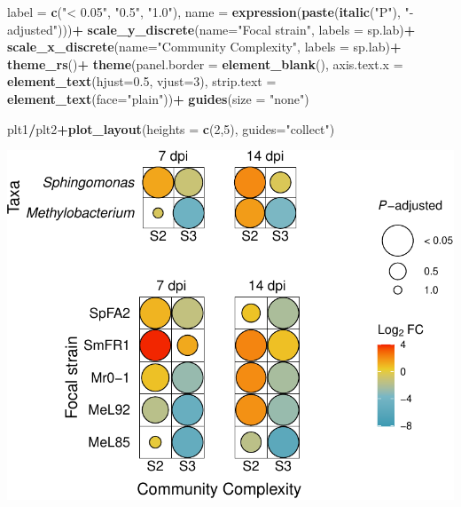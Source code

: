 \documentclass[
]{article}
\newenvironment{Shaded}{\begin{snugshade}}{\end{snugshade}}
\newcommand{\AttributeTok}[1]{\textcolor[rgb]{0.13,0.29,0.53}{#1}}
\newcommand{\DecValTok}[1]{\textcolor[rgb]{0.00,0.00,0.81}{#1}}
\newcommand{\FloatTok}[1]{\textcolor[rgb]{0.00,0.00,0.81}{#1}}
\newcommand{\FunctionTok}[1]{\textcolor[rgb]{0.13,0.29,0.53}{\textbf{#1}}}
\newcommand{\NormalTok}[1]{#1}
\newcommand{\SpecialCharTok}[1]{\textcolor[rgb]{0.81,0.36,0.00}{\textbf{#1}}}
\newcommand{\StringTok}[1]{\textcolor[rgb]{0.31,0.60,0.02}{#1}}
\begin{document}
\begin{Shaded}
\begin{Highlighting}[]
                          \AttributeTok{label =} \FunctionTok{c}\NormalTok{(}\StringTok{"\textless{} 0.05"}\NormalTok{, }\StringTok{"0.5"}\NormalTok{, }\StringTok{"1.0"}\NormalTok{), }\AttributeTok{name =} \FunctionTok{expression}\NormalTok{(}\FunctionTok{paste}\NormalTok{(}\FunctionTok{italic}\NormalTok{(}\StringTok{"P"}\NormalTok{), }\StringTok{"{-}adjusted"}\NormalTok{)))}\SpecialCharTok{+}
    \FunctionTok{scale\_y\_discrete}\NormalTok{(}\AttributeTok{name=}\StringTok{"Focal strain"}\NormalTok{, }\AttributeTok{labels =}\NormalTok{ sp.lab)}\SpecialCharTok{+}
    \FunctionTok{scale\_x\_discrete}\NormalTok{(}\AttributeTok{name=}\StringTok{"Community Complexity"}\NormalTok{, }\AttributeTok{labels =}\NormalTok{ sp.lab)}\SpecialCharTok{+}
    \FunctionTok{theme\_rs}\NormalTok{()}\SpecialCharTok{+}
    \FunctionTok{theme}\NormalTok{(}\AttributeTok{panel.border =} \FunctionTok{element\_blank}\NormalTok{(),}
          \AttributeTok{axis.text.x =} \FunctionTok{element\_text}\NormalTok{(}\AttributeTok{hjust=}\FloatTok{0.5}\NormalTok{, }\AttributeTok{vjust=}\DecValTok{3}\NormalTok{),}
          \AttributeTok{strip.text =} \FunctionTok{element\_text}\NormalTok{(}\AttributeTok{face=}\StringTok{"plain"}\NormalTok{))}\SpecialCharTok{+}
    \FunctionTok{guides}\NormalTok{(}\AttributeTok{size =} \StringTok{"none"}\NormalTok{)}

\NormalTok{plt1}\SpecialCharTok{/}\NormalTok{plt2}\SpecialCharTok{+}\FunctionTok{plot\_layout}\NormalTok{(}\AttributeTok{heights =} \FunctionTok{c}\NormalTok{(}\DecValTok{2}\NormalTok{,}\DecValTok{5}\NormalTok{), }\AttributeTok{guides=}\StringTok{"collect"}\NormalTok{)}
\end{Highlighting}
\end{Shaded}

\includegraphics{results1_bacdensity_communitycomplexity_files/figure-latex/plot fig3b-1.pdf}
\end{document}

